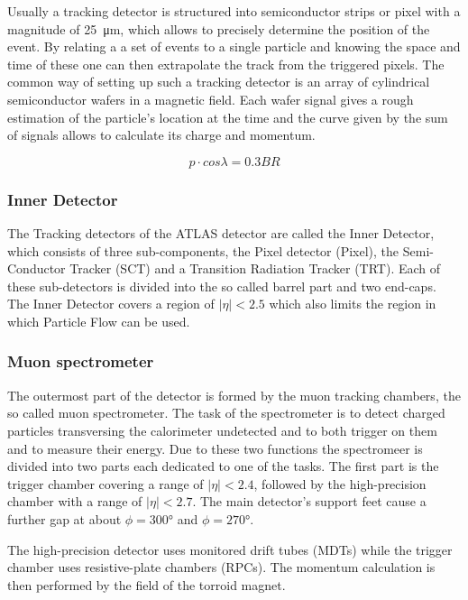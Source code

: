 Usually a tracking detector is structured into semiconductor strips or pixel with a magnitude of \SI{25}{\micro \metre}, which allows to precisely determine the position of the event. By relating a a set of events to a single particle and knowing the space and time of these one can then extrapolate the track from the triggered pixels. The common way of setting up such a tracking detector is an array of cylindrical semiconductor wafers in a magnetic field. Each wafer signal gives a rough estimation of the particle's location at the time and the curve given by the sum of signals allows to calculate its charge and momentum.

\begin{equation}
p \cdot cos \lambda = 0.3 BR
\end{equation}


\subsubsection{Inner Detector}

The Tracking detectors of the ATLAS detector are called the Inner Detector, which consists of three sub-components, the Pixel detector (Pixel), the Semi-Conductor Tracker (SCT) and a Transition Radiation Tracker (TRT). Each of these sub-detectors is divided into the so called barrel part and two end-caps. The Inner Detector covers a region of $|\eta| < \num{2.5}$ which also limits the region in which Particle Flow can be used.

\subsubsection{Muon spectrometer}

The outermost part of the detector is formed by the muon tracking chambers, the so called muon spectrometer. The task of the spectrometer is to detect charged particles transversing the calorimeter undetected and to both trigger on them and to measure their energy. Due to these two functions the spectromeer is divided into two parts each dedicated to one of the tasks. The first part is the trigger chamber covering a range of $|\eta|<2.4$, followed by the high-precision chamber with a range of $|\eta|<2.7$. The main detector's support feet cause a further gap at about $\phi = \ang{300}$ and $\phi = \ang{270}$. 

The high-precision detector uses monitored drift tubes (MDTs) while the trigger chamber uses resistive-plate chambers (RPCs). The momentum calculation is then performed by the field of the torroid magnet.


